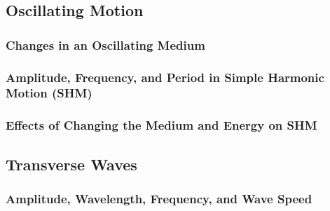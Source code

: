 \documentclass[../main-physics-problems.tex]{subfiles}
\begin{document}
\subsection{Oscillating Motion}

\subsubsection{Changes in an Oscillating Medium}

\subsubsection{Amplitude, Frequency, and Period in Simple Harmonic Motion (SHM)}

\subsubsection{Effects of Changing the Medium and Energy on SHM}

\clearpage

\subsection{Transverse Waves}

\subsubsection{Amplitude, Wavelength, Frequency, and Wave Speed}
\end{document}
